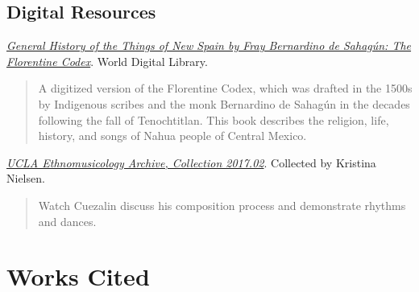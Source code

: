\documentclass{article}
\begin{document}
\hypertarget{digital-resources}{%
\subsection*{Digital Resources}\label{digital-resources}}

 \emph{\href{https://www.wdl.org/en/item/10096/}{General
History of the Things of New Spain by Fray Bernardino de Sahagún: The
Florentine Codex}}. World Digital Library.

\begin{quote}
A digitized version of the Florentine Codex, which was drafted in the
1500s by Indigenous scribes and the monk Bernardino de Sahagún in the
decades following the fall of Tenochtitlan. This book describes the
religion, life, history, and songs of Nahua people of Central Mexico.
\end{quote}


 \href{https://archive.org/details/calauem_201702_item_16_6-9/DSC_0003_Cuezalin+talking+about+and+playing+Maquil+Xochitl+and+Nayeli.MOV}{\emph{UCLA
Ethnomusicology Archive, Collection 2017.02}}. Collected by Kristina
Nielsen.

\begin{quote}
Watch Cuezalin discuss his composition process and demonstrate rhythms
and dances.
\end{quote}

\hypertarget{works-cited}{%
\section*{Works Cited}\label{works-cited}}
\end{document}
